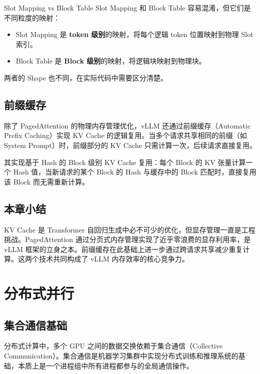 \documentclass[a4paper]{article}
\begin{document}
\begin{warningbox}{Slot Mapping vs Block Table}
    Slot Mapping 和 Block Table 容易混淆，但它们是不同粒度的映射：
    \begin{itemize}
        \item Slot Mapping 是 \textbf{token 级别}的映射，将每个逻辑 token 位置映射到物理 Slot 索引。
        \item Block Table 是 \textbf{Block 级别}的映射，将逻辑块映射到物理块。
    \end{itemize}
    两者的 Shape 也不同，在实际代码中需要区分清楚。
\end{warningbox}

\subsection{前缀缓存}

除了 PagedAttention 的物理内存管理优化，vLLM 还通过前缀缓存（Automatic Prefix Caching）实现 KV Cache 的逻辑复用。当多个请求共享相同的前缀（如 System Prompt）时，前缀部分的 KV Cache 只需计算一次，后续请求直接复用。

其实现基于 Hash 的 Block 级别 KV Cache 复用：每个 Block 的 KV 张量计算一个 Hash 值，当新请求的某个 Block 的 Hash 与缓存中的 Block 匹配时，直接复用该 Block 而无需重新计算。

\subsection{本章小结}

KV Cache 是 Transformer 自回归生成中必不可少的优化，但显存管理一直是工程挑战。PagedAttention 通过分页式内存管理实现了近乎零浪费的显存利用率，是 vLLM 框架的立身之本。前缀缓存在此基础上进一步通过跨请求共享减少重复计算。这两个技术共同构成了 vLLM 内存效率的核心竞争力。


\section{分布式并行}

\subsection{集合通信基础}

分布式计算中，多个 GPU 之间的数据交换依赖于集合通信（Collective Communication）。集合通信是机器学习集群中实现分布式训练和推理系统的基础，本质上是一个进程组中所有进程都参与的全局通信操作。
\end{document}
